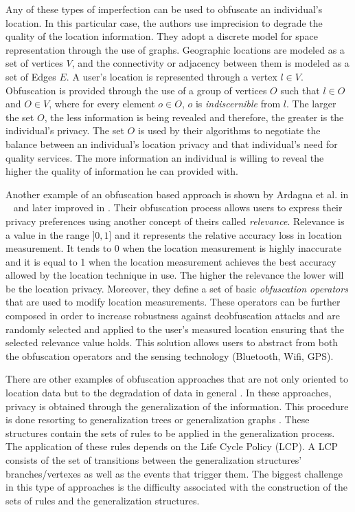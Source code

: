 Any of these types of imperfection can be used to obfuscate an
individual's location. In this particular case, the authors use
imprecision to degrade the quality of the location information.
They adopt a discrete model for space representation through the use of
graphs. Geographic locations are modeled as a set of vertices $V$, and
the connectivity or adjacency between them is modeled as a set of
Edges $E$. A user's location is represented through a
vertex $l \in V$. Obfuscation is provided through the use of a group
of vertices $O$ such that $l \in O$ and $O \in V$, where for every
element $o \in O$, $o$ is \emph{indiscernible} from $l$. The larger
the set $O$, the less information is being revealed and therefore, the
greater is the individual's privacy. The set $O$ is used by their
algorithms to negotiate the balance between an individual's location
privacy and that individual's need for quality services. The more
information an individual is willing to reveal the higher the quality
of information he can provided with.

Another example of an obfuscation based approach is shown by
Ardagna et al. in ~\cite{ardagna2007middleware} and later improved in
\cite{ardagna2007location, ardagna2011obfuscation}. Their obfuscation
process allows users to express their privacy preferences using
another concept of theirs called \emph{relevance}. Relevance is a
value in the range $]0,1]$ and it represents the relative accuracy
loss in location measurement. It tends to 0 when the location
measurement is highly inaccurate and it is equal to 1 when the
location measurement achieves the best accuracy allowed by the
location technique in use. The higher the relevance the lower will be the
location privacy. Moreover, they define a set of basic
\emph{obfuscation operators} that are used to modify location
measurements. These operators can be further composed in order to
increase robustness against deobfuscation attacks and are
randomly selected and applied to the user's measured location ensuring
that the selected relevance value holds. This solution allows users to
abstract from both the obfuscation operators and the sensing
technology (Bluetooth, Wifi, GPS).

There are other examples of obfuscation approaches that are not only
oriented to location data but to the degradation of data in general
\cite{anciaux2008instantdb,heerde2006data}. In these approaches,
privacy is obtained through the generalization of the information.
This procedure is done resorting to generalization trees
\cite{anciaux2008instantdb} or generalization graphs
\cite{heerde2006data}. These structures contain the sets of rules to
be applied in the generalization process. The application of these
rules depends on the Life Cycle Policy (LCP). A LCP consists of the
set of transitions between the generalization structures'
branches/vertexes as well as the events that trigger them. The biggest
challenge in this type of approaches is the difficulty associated with 
the construction of the sets of rules and the generalization
structures.

